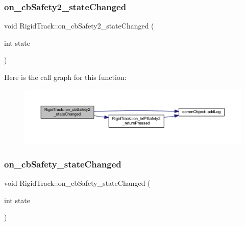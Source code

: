 \mbox{\label{class_rigid_track_ad6ba1cfe25f18ff0d9f5993aafa36d16}} 
\subsubsection{\texorpdfstring{on\+\_\+cb\+Safety2\+\_\+state\+Changed}{on\_cbSafety2\_stateChanged}}
{\footnotesize\ttfamily void Rigid\+Track\+::on\+\_\+cb\+Safety2\+\_\+state\+Changed (\begin{DoxyParamCaption}\item[{int}]{state }\end{DoxyParamCaption})\hspace{0.3cm}{\ttfamily [slot]}}

Here is the call graph for this function\+:
\nopagebreak
\begin{figure}[H]
\begin{center}
\leavevmode
\includegraphics[width=350pt]{class_rigid_track_ad6ba1cfe25f18ff0d9f5993aafa36d16_cgraph}
\end{center}
\end{figure}
\mbox{\label{class_rigid_track_a8f999fa968f4cc9fa548bdc8438b32c4}} 
\subsubsection{\texorpdfstring{on\+\_\+cb\+Safety\+\_\+state\+Changed}{on\_cbSafety\_stateChanged}}
{\footnotesize\ttfamily void Rigid\+Track\+::on\+\_\+cb\+Safety\+\_\+state\+Changed (\begin{DoxyParamCaption}\item[{int}]{state }\end{DoxyParamCaption})\hspace{0.3cm}{\ttfamily [slot]}}

